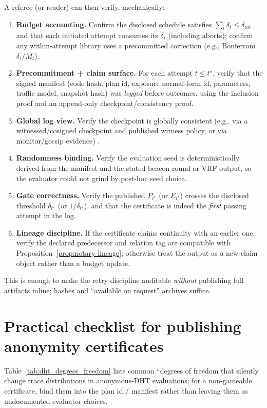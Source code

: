 \documentclass[11pt]{article}
\begin{document}
A referee (or reader) can then verify, mechanically:
\begin{enumerate}
\item \textbf{Budget accounting.} Confirm the disclosed schedule satisfies $\sum_t \delta_t \le \delta_{\text{tot}}$ and that each initiated attempt consumes its $\delta_t$
(including aborts); confirm any within-attempt library uses a precommitted correction (e.g., Bonferroni $\delta_t/M_t$).
\item \textbf{Precommitment + claim surface.} For each attempt $t\le t^\star$, verify that the signed manifest (code hash, plan id, exposure normal-form id, parameters, traffic model, snapshot hash) was \emph{logged} before outcomes,
using the inclusion proof and an append-only checkpoint/consistency proof.
\item \textbf{Global log view.} Verify the checkpoint is globally consistent (e.g., via a witnessed/cosigned checkpoint and published witness policy, or via monitor/gossip evidence) \cite{c2sp_tlog_witness,c2sp_tlog_cosignature}.
\item \textbf{Randomness binding.} Verify the evaluation seed is deterministically derived from the manifest and the stated beacon round or VRF output, so the evaluator could not grind by post-hoc seed choice.
\item \textbf{Gate correctness.} Verify the published $P_{t^\star}$ (or $E_{t^\star}$) crosses the disclosed threshold $\delta_{t^\star}$ (or $1/\delta_{t^\star}$), and that the certificate is indeed the \emph{first} passing attempt in the log.
\item \textbf{Lineage discipline.} If the certificate claims continuity with an earlier one, verify the declared predecessor and relation tag are compatible with Proposition~\ref{prop:notary-lineage}; otherwise treat the output as a new claim object rather than a budget update.
\end{enumerate}
This is enough to make the retry discipline auditable \emph{without} publishing full artifacts inline; hashes and ``available on request'' archives suffice.






\section{Practical checklist for publishing anonymity certificates}
\noindent Table~\ref{tab:dht_degrees_freedom} lists common ``degrees of freedom that silently change trace distributions in anonymous-DHT evaluations;
for a non-gameable certificate, bind them into the plan id / manifest rather than leaving them as undocumented evaluator choices.
\end{document}
